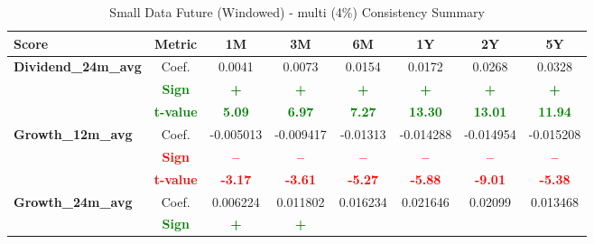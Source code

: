 \documentclass[11pt,english,a4paper,hidelinks]{book}
\begin{document}
\begin{table}[H]
    \centering
    \caption{Small Data Future (Windowed) - \acrshort{multi} (4\%) Consistency Summary}
    \begin{tabular}{lccccccc}
        \toprule
        \textbf{Score} & \textbf{Metric} & \textbf{1M} & \textbf{3M} & \textbf{6M} & \textbf{1Y} & \textbf{2Y} & \textbf{5Y} \\
        \midrule
        \multirow{3}{*}{\textbf{Dividend\_24m\_avg}} 
        & Coef.   & 0.0041   & 0.0073  & 0.0154  & 0.0172  & 0.0268  & 0.0328  \\
        & \textbf{\textcolor{green}{Sign}}
                     & \textbf{\textcolor{green}{+}}
                     & \textbf{\textcolor{green}{+}}
                     & \textbf{\textcolor{green}{+}}
                     & \textbf{\textcolor{green}{+}}
                     & \textbf{\textcolor{green}{+}}
                     & \textbf{\textcolor{green}{+}} \\
        & \textbf{\textcolor{green}{t-value}}
                     & \textbf{\textcolor{green}{5.09}}
                     & \textbf{\textcolor{green}{6.97}}
                     & \textbf{\textcolor{green}{7.27}}
                     & \textbf{\textcolor{green}{13.30}}
                     & \textbf{\textcolor{green}{13.01}}
                     & \textbf{\textcolor{green}{11.94}} \\
        \midrule
        \multirow{3}{*}{\textbf{Growth\_12m\_avg}}
            & Coef.   & -0.005013 & -0.009417 & -0.01313  & -0.014288 & -0.014954 & -0.015208 \\
            & \textbf{\textcolor{red}{Sign}}    & \textbf{\textcolor{red}{–}}         & \textbf{\textcolor{red}{–}}         & \textbf{\textcolor{red}{–}}         & \textbf{\textcolor{red}{–}}         & \textbf{\textcolor{red}{–}}         & \textbf{\textcolor{red}{–}}         \\
            & \textbf{\textcolor{red}{t-value}} & \textbf{\textcolor{red}{-3.17}}     & \textbf{\textcolor{red}{-3.61}}     & \textbf{\textcolor{red}{-5.27}}     & \textbf{\textcolor{red}{-5.88}}     & \textbf{\textcolor{red}{-9.01}}     & \textbf{\textcolor{red}{-5.38}}     \\
        \midrule
        \multirow{3}{*}{\textbf{Growth\_24m\_avg}}
            & Coef.   & 0.006224  & 0.011802  & 0.016234  & 0.021646  & 0.02099   & 0.013468  \\
            & \textbf{\textcolor{green}{Sign}}
                     & \textbf{\textcolor{green}{+}}
                     & \textbf{\textcolor{green}{+}}

\end{tabular}
\end{table}
\end{document}
